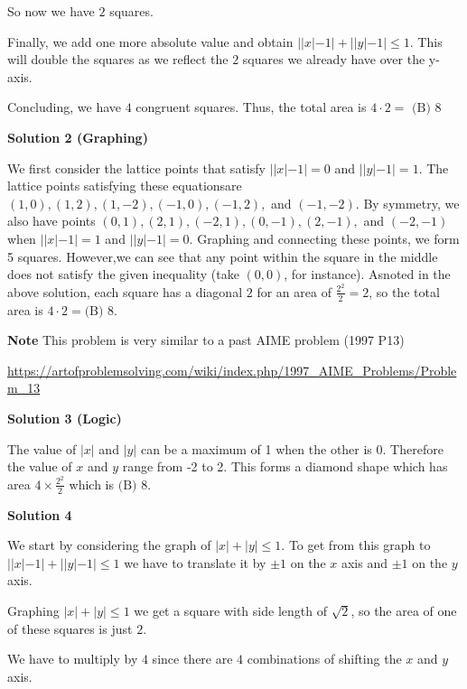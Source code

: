 \begin{enumerate}
 So now we have $2$ squares.

 Finally, we add one more absolute value and obtain $||x|-1|+||y|-1| \le 1.$ This will double the squares as we reflect the $2$ squares we already have over the y-axis.

 Concluding, we have $4$ congruent squares. Thus, the total area is $4\cdot2 =$ $\boxed{\text{(B) 8}}$




\textbf{Solution 2 (Graphing)}

We first consider the lattice points that satisfy $||x|-1| = 0$ and $||y|-1| = 1$. The lattice points satisfying these equationsare $(1,0), (1,2), (1,-2), (-1,0), (-1,2),$ and $(-1,-2).$ By symmetry, we also have points $(0,1), (2,1), (-2,1), (0,-1), (2,-1),$ and  $(-2,-1)$  when  $||x|-1| = 1$ and $||y|-1| = 0$.  Graphing and connecting these points, we form 5 squares. However,we can see that any point within the square in the middle does not satisfy the given inequality (take $(0,0)$, for instance). Asnoted in the above solution, each square has a diagonal $2$ for an area of $\frac{2^2}{2} = 2$, so the total area is $4\cdot2 =$$\boxed{\text{(B) 8}}.$ 

 \textbf{Note} This problem is very similar to a past AIME problem (1997 P13)

 \href{https://artofproblemsolving.com/wiki/index.php/1997\_AIME\_Problems/Problem\_13}{https://artofproblemsolving.com/wiki/index.php/1997\_AIME\_Problems/Problem\_13}

 



\textbf{Solution 3 (Logic)}

The value of $|x|$ and $|y|$ can be a maximum of 1 when the other is 0. Therefore the value of $x$ and $y$ range from -2 to 2. This forms a diamond shape which has area $4 \times \frac{2^2}{2}$ which is $\boxed{\text{(B) 8}}.$




\textbf{Solution 4}

We start by considering the graph of $|x|+|y|\leq 1$. To get from this graph to $||x|-1|+||y|-1| \leq 1$ we have to translate it by $\pm 1$ on the $x$ axis and $\pm 1$ on the $y$ axis.

 Graphing $|x|+|y|\leq 1$ we get a square with side length of $\sqrt{2}$, so the area of one of these squares is just $2$.

 We have to multiply by $4$ since there are $4$ combinations of shifting the $x$ and $y$ axis.


\end{enumerate}
